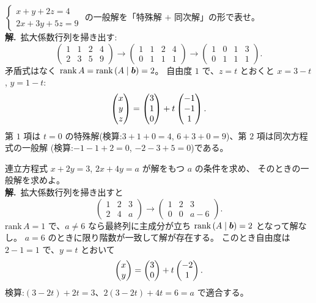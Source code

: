 \begin{rei}[例題・基本(非同次方程式と構造定理)]\label{rei:sol-nonhomog}
$\begin{cases} x + y + 2z = 4 \\ 2x + 3y + 5z = 9 \end{cases}$
の一般解を「特殊解 $+$ 同次解」の形で表せ。\\
\textbf{解.}\ 拡大係数行列を掃き出す:
\[
\left(\begin{array}{ccc|c} 1 & 1 & 2 & 4 \\ 2 & 3 & 5 & 9 \end{array}\right)
\longrightarrow
\left(\begin{array}{ccc|c} 1 & 1 & 2 & 4 \\ 0 & 1 & 1 & 1 \end{array}\right)
\longrightarrow
\left(\begin{array}{ccc|c} 1 & 0 & 1 & 3 \\ 0 & 1 & 1 & 1 \end{array}\right).
\]
矛盾式はなく $\mathrm{rank}\,A = \mathrm{rank}\,(A \mid \bm{b}) = 2$。
自由度 $1$ で、$z = t$ とおくと $x = 3 - t$, $y = 1 - t$:
\[
\begin{pmatrix}x \\ y \\ z\end{pmatrix} = \begin{pmatrix}3 \\ 1 \\ 0\end{pmatrix} + t\begin{pmatrix}-1 \\ -1 \\ 1\end{pmatrix}.
\]
第 $1$ 項は $t = 0$ の特殊解(検算:$3 + 1 + 0 = 4$,
$6 + 3 + 0 = 9$)、第 $2$ 項は同次方程式の一般解
(検算:$-1 - 1 + 2 = 0$, $-2 - 3 + 5 = 0$)である。
\end{rei}

\begin{rei}[例題・基本(存在条件)]\label{rei:sol-exist}
連立方程式 $x + 2y = 3$, $2x + 4y = a$ が解をもつ $a$ の条件を求め、
そのときの一般解を求めよ。\\
\textbf{解.}\ 拡大係数行列を掃き出すと
\[
\left(\begin{array}{cc|c} 1 & 2 & 3 \\ 2 & 4 & a \end{array}\right)
\longrightarrow
\left(\begin{array}{cc|c} 1 & 2 & 3 \\ 0 & 0 & a - 6 \end{array}\right).
\]
$\mathrm{rank}\,A = 1$ で、$a \neq 6$ なら最終列に主成分が立ち
$\mathrm{rank}\,(A \mid \bm{b}) = 2$ となって解なし。
$a = 6$ のときに限り階数が一致して解が存在する。
このとき自由度は $2 - 1 = 1$ で、$y = t$ とおいて
\[
\begin{pmatrix}x \\ y\end{pmatrix} = \begin{pmatrix}3 \\ 0\end{pmatrix} + t\begin{pmatrix}-2 \\ 1\end{pmatrix}.
\]
検算:$(3 - 2t) + 2t = 3$、$2(3 - 2t) + 4t = 6 = a$ で適合する。
\end{rei}

